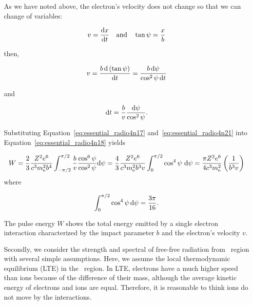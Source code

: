 As we have noted above, the electron's velocity does not change so that we can change of variables:

\begin{equation}\label{eq:essential_radio4n19}
    v = \frac{\mathrm{d} x}{\mathrm{d} t}\ \ \ \mathrm{and}\ \ \ \tan\psi = \frac{x}{b}
\end{equation}

then,

\begin{equation}\label{eq:essential_radio4n20}
    v=\frac{b\,\mathrm{d}\left(\tan \psi\right)}{\mathrm{d} t} = \frac{b\,\mathrm{d} \psi}{\cos ^{2}\psi\,\mathrm{d} t}
\end{equation}

and

\begin{equation}\label{eq:essential_radio4n21}
    \mathrm{d} t=\frac{b}{v} \frac{\mathrm{d} \psi}{\cos ^{2} \psi}.
\end{equation}

Substituting Equation~\ref{eq:essential_radio4n17} and~\ref{eq:essential_radio4n21} into Equation~\ref{eq:essential_radio4n18} yields

\begin{equation}\label{eq:essential_radio4n22}
    W=\frac{2}{3} \frac{Z^{2} e^{6}}{c^{3} m_{\mathrm{e}}^{2} b^{4}} \int_{-\pi / 2}^{\pi / 2} \frac{b}{v} \frac{\cos ^{6} \psi}{\cos ^{2} \psi} \mathrm{d} \psi=\frac{4}{3} \frac{Z^{2} e^{6}}{c^{3} m_{\mathrm{e}}^{2} b^{3} v} \int_{0}^{\pi / 2} \cos ^{4} \psi\ \mathrm{d} \psi = \frac{\pi Z^2 e^6}{4 c^3 m_{\mathrm{e}}^2}\left(\frac{1}{b^3v}\right)
\end{equation}
where

\begin{equation}\label{eq:integral_costo4}
    \int_{0}^{\pi / 2} \cos ^{4} \psi\,\mathrm{d} \psi=\frac{3 \pi}{16}.
\end{equation}

The pulse energy $W$ shows the total energy emitted by a single electron interaction characterized by the impact parameter $b$ and the electron's velocity $v$.\\ \vspace{0.2cm}

Secondly, we consider the strength and spectral of free-free radiation from \ih~region with several simple assumptions.
Here, we assume the local thermodynamic equilibrium (LTE) in the \ih~region.
In LTE, electrons have a much higher speed than ions because of the difference of their mass, although the average kinetic energy of electrons and ions are equal.
Therefore, it is reasonable to think ions do not move by the interactions.

